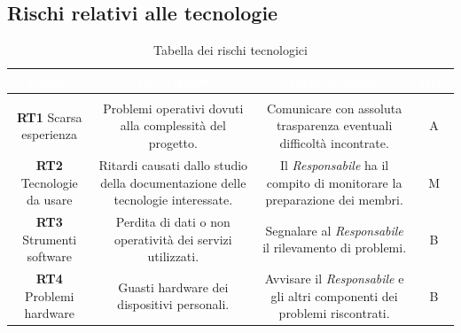 \subsection{Rischi relativi alle tecnologie}
\begin{center}
\begin{longtable}{C{\colA} | C{\colB} | C{\colC} | C{\colD}}
		\textcolor{white}{\textbf{Codice}} & 
		\textcolor{white}{\textbf{Descrizione}} & 
		\textcolor{white}{\textbf{Identificazione}} & 
		\textcolor{white}{\textbf{Occ.}} \\
		\endfirsthead
	    \\
	    \endfoot
	    \caption{Tabella dei rischi tecnologici}
	    \endlastfoot

\textbf{RT1} \newline Scarsa esperienza &

Problemi operativi dovuti alla complessità del progetto. & 

Comunicare con assoluta trasparenza eventuali difficoltà incontrate.  & 

A \\

\textbf{RT2} \newline Tecnologie da usare &

Ritardi causati dallo studio della documentazione delle tecnologie interessate. & 

Il \textit{Responsabile} ha il compito di monitorare la preparazione dei membri.  & 

M \\

\textbf{RT3} \newline Strumenti software &

Perdita di dati o non operatività dei servizi utilizzati. & 

Segnalare al \textit{Responsabile} il rilevamento di problemi.  & 

B \\

\textbf{RT4} \newline Problemi hardware &

Guasti hardware dei dispositivi personali. & 

Avvisare il \textit{Responsabile} e gli altri componenti dei problemi riscontrati.  & 

B \\

\end{longtable}
\end{center}

